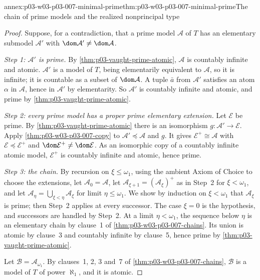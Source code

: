 \begin{annexitem}{annex:p03-w03-p03-007-minimal-prime}{thm:p03-w03-p03-007-minimal-prime}{The chain of prime models and the realized nonprincipal type}
\begin{proof}
Suppose, for a contradiction, that a prime model \(\mathcal A\) of \(T\) has
an elementary submodel \(\mathcal A'\) with
\(\dom\mathcal A'\neq\dom\mathcal A\).

\emph{Step 1: \(\mathcal A'\) is prime.} By
\cref{thm:p03-vaught-prime-atomic}, \(\mathcal A\) is countably infinite and
atomic. \(\mathcal A'\) is a model of \(T\), being elementarily equivalent to
\(\mathcal A\), so it is infinite; it is countable as a subset of
\(\dom\mathcal A\). A tuple \(\bar a\) from \(\mathcal A'\) satisfies an atom
\(\alpha\) in \(\mathcal A\), hence in \(\mathcal A'\) by elementarity. So
\(\mathcal A'\) is countably infinite and atomic, and prime by
\cref{thm:p03-vaught-prime-atomic}.

\emph{Step 2: every prime model has a proper prime elementary extension.}
Let \(\mathcal E\) be prime. By \cref{thm:p03-vaught-prime-atomic} there is
an isomorphism \(g\colon\mathcal A'\to\mathcal E\). Apply
\cref{thm:p03-w03-p03-007-copy} to \(\mathcal A'\preccurlyeq\mathcal A\) and
\(g\). It gives \(\mathcal E^+\cong\mathcal A\) with
\(\mathcal E\preccurlyeq\mathcal E^+\) and
\(\dom\mathcal E^+\neq\dom\mathcal E\). As an isomorphic copy of a countably
infinite atomic model, \(\mathcal E^+\) is countably infinite and atomic,
hence prime.

\emph{Step 3: the chain.} By recursion on \(\xi\le\omega_1\), using the
ambient Axiom of Choice to choose the extensions, let
\(\mathcal A_0=\mathcal A\), let
\(\mathcal A_{\xi+1}=(\mathcal A_\xi)^+\) as in Step~2 for \(\xi<\omega_1\),
and let \(\mathcal A_\eta=\bigcup_{\xi<\eta}\mathcal A_\xi\) for limit
\(\eta\le\omega_1\). We show by induction on \(\xi<\omega_1\) that
\(\mathcal A_\xi\) is prime; then Step~2 applies at every successor.
The case \(\xi=0\) is the hypothesis, and successors are handled by Step~2.
At a limit \(\eta<\omega_1\), the sequence below \(\eta\) is an elementary
chain by clause~1 of \cref{thm:p03-w03-p03-007-chains}. Its union is atomic
by clause~3 and countably infinite by clause~5, hence prime by
\cref{thm:p03-vaught-prime-atomic}.

Let \(\mathcal B=\mathcal A_{\omega_1}\). By clauses~1, 2, 3 and~7 of
\cref{thm:p03-w03-p03-007-chains}, \(\mathcal B\) is a model of \(T\) of
power \(\aleph_1\), and it is atomic.


\end{proof}
\end{annexitem}

